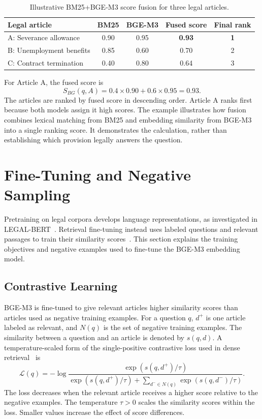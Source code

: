 \begin{table}[H]
    \centering
    \caption{Illustrative BM25+BGE-M3 score fusion for three legal articles.}
    \label{tab:score-fusion-example}
    \begin{tabular}{lcccc}
        \toprule
        \textbf{Legal article} & \textbf{BM25} & \textbf{BGE-M3} & \textbf{Fused score} & \textbf{Final rank} \\
        \midrule
        A: Severance allowance & 0.90 & 0.95 & \textbf{0.93} & \textbf{1} \\
        B: Unemployment benefits & 0.85 & 0.60 & 0.70 & 2 \\
        C: Contract termination & 0.40 & 0.80 & 0.64 & 3 \\
        \bottomrule
    \end{tabular}
\end{table}

For Article A, the fused score is
\[
S_{BG}(q,A)=0.4\times0.90+0.6\times0.95=0.93.
\]
The articles are ranked by fused score in descending order. Article A ranks first because both models assign it high scores. The example illustrates how fusion combines lexical matching from BM25 and embedding similarity from BGE-M3 into a single ranking score. It demonstrates the calculation, rather than establishing which provision legally answers the question.

\section{Fine-Tuning and Negative Sampling}

Pretraining on legal corpora develops language representations, as investigated in LEGAL-BERT~\cite{chalkidis2020}. Retrieval fine-tuning instead uses labeled questions and relevant passages to train their similarity scores~\cite{karpukhin2020}. This section explains the training objectives and negative examples used to fine-tune the BGE-M3 embedding model.

\subsection{Contrastive Learning}

BGE-M3 is fine-tuned to give relevant articles higher similarity scores than articles used as negative training examples. For a question \(q\), \(d^+\) is one article labeled as relevant, and \(N(q)\) is the set of negative training examples. The similarity between a question and an article is denoted by \(s(q,d)\). A temperature-scaled form of the single-positive contrastive loss used in dense retrieval~\cite{karpukhin2020} is
\[
\mathcal L(q)=-\log\frac{\exp(s(q,d^+)/\tau)}{\exp(s(q,d^+)/\tau)+\sum_{d^-\in N(q)}\exp(s(q,d^-)/\tau)}.
\]
The loss decreases when the relevant article receives a higher score relative to the negative examples. The temperature \(\tau>0\) scales the similarity scores within the loss. Smaller values increase the effect of score differences.

